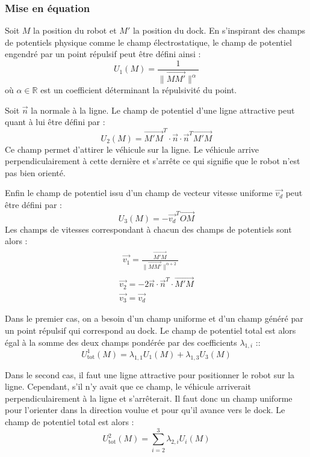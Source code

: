 \documentclass[12pt]{report}
\begin{document}
\subsubsection{Mise en équation}

Soit $M$ la position du robot et $M'$ la position du dock. En s'inspirant des champs de potentiels physique comme le champ électrostatique, le champ de potentiel engendré par un point répulsif peut être défini ainsi :
\[ U_1 (M) = \frac{1}{\| \overrightarrow{M M'} \|^{\alpha}} \]
où $\alpha \in \mathbb{R}$ est un coefficient déterminant la répulsivité du point.

Soit $\overrightarrow{n}$ la normale à la ligne. Le champ de potentiel d'une ligne attractive peut quant à lui être défini par :
\[ U_2 (M) = \overrightarrow{M' M}^T \cdot \vec{n} \cdot \vec{n}^T \overrightarrow{M' M} \]
Ce champ permet d'attirer le véhicule sur la ligne. Le véhicule arrive perpendiculairement à cette dernière et s'arrête ce qui signifie que le robot n'est pas bien orienté.

Enfin le champ de potentiel issu d'un champ de vecteur vitesse uniforme $\overrightarrow{v_d}$ peut être défini par :
\[ U_3 (M) = - \overrightarrow{v_d}^T \overrightarrow{OM} \]
Les champs de vitesses correspondant à chacun des champs de potentiels sont alors :
\[ \begin{array}{c}
     \begin{array}{c}
       \overrightarrow{v_1} = \frac{\overrightarrow{M' M}}{\| \overrightarrow{M M'} \|^{\alpha + 2}}
     \end{array}\\
     \overrightarrow{v_2} = - 2 \vec{n} \cdot \vec{n}^T \cdot \overrightarrow{M' M}\\
     \overrightarrow{v_3} = \overrightarrow{v_d}
   \end{array} \]


Dans le premier cas, on a besoin d'un champ uniforme et d'un champ généré par un point répulsif qui correspond au dock. Le champ de potentiel total est alors égal à la somme des deux champs pondérée par des coefficients $\lambda_{1,i}$ ::
\[ U^1_{\text{tot}} (M) = \lambda_{1, 1} U_1 (M) + \lambda_{1, 3} U_3 (M) \]

Dans le second cas, il faut une ligne attractive pour positionner le robot sur la ligne. Cependant, s'il n'y avait que ce champ, le véhicule arriverait perpendiculairement à la ligne et s'arrêterait. Il faut donc un champ uniforme pour l'orienter dans la direction voulue et pour qu'il avance vers le dock. Le champ de potentiel total est alors :
\[ U^2_{\text{tot}} (M) = \sum_{i = 2}^3 \lambda_{2, i} U_i (M) \]
\end{document}
